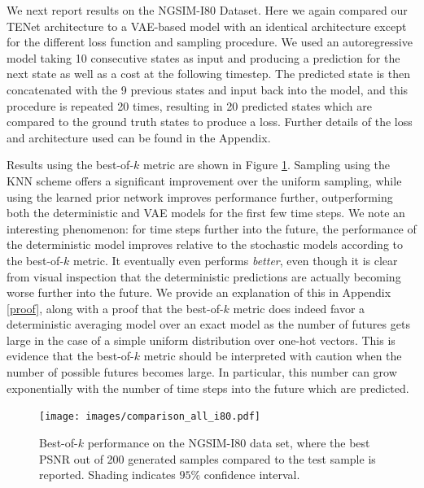 \documentclass{article}
\newcommand{\modelname}{TENet }
\begin{document}
We next report results on the NGSIM-I80 Dataset. Here we again compared our \modelname architecture to a VAE-based model with an identical architecture except for the different loss function and sampling procedure.
We used an autoregressive model taking 10 consecutive states as input and producing a prediction for the next state as well as a cost at the following timestep.
The predicted state is then concatenated with the 9 previous states and input back into the model, and this procedure is repeated 20 times, resulting in 20 predicted states which are compared to the ground truth states to produce a loss. Further details of the loss and architecture used can be found in the Appendix.

Results using the best-of-$k$ metric are shown in Figure \ref{best-of-k-i80}.
Sampling using the KNN scheme offers a significant improvement over the uniform sampling, while using the learned prior network improves performance further, outperforming both the deterministic and VAE models for the first few time steps.
We note an interesting phenomenon: for time steps further into the future, the performance of the deterministic model improves relative to the stochastic models according to the best-of-$k$ metric. It eventually even performs \emph{better}, even though it is clear from visual inspection that the deterministic predictions are actually becoming worse further into the future.
We provide an explanation of this in Appendix \ref{proof}, along with a proof that the best-of-$k$ metric does indeed favor a deterministic averaging model over an exact model as the number of futures gets large in the case of a simple uniform distribution over one-hot vectors.
This is evidence that the best-of-$k$ metric should be interpreted with caution when the number of possible futures becomes large.
In particular, this number can grow exponentially with the number of time steps into the future which are predicted.


\begin{figure}[t!]
  \centering
  \texttt{[image: images/comparison\_all\_i80.pdf]}
  \caption{Best-of-$k$ performance on the NGSIM-I80 data set, where the best PSNR out of 200 generated samples compared to the test sample is reported. Shading indicates $95\%$ confidence interval. }
  \label{best-of-k-i80}
\end{figure}
\end{document}

